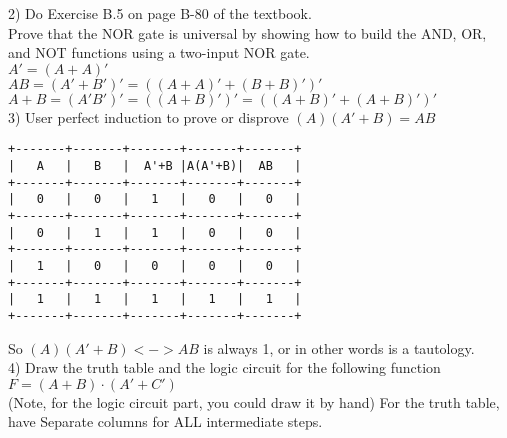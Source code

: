 2) Do Exercise B.5 on page B-80 of the textbook. \\

Prove that the NOR gate is universal by showing how to build
the AND, OR, and NOT functions using a two-input NOR gate. \\

$A' = (A + A)'$ \\

$AB = (A' + B')' = ((A+A)' + (B+B)')'$ \\

$A+B = (A'B')' = ((A+B)')' = ((A+B)' + (A+B)')'$ \\

3) User perfect induction to prove or disprove $(A) (A' + B) = AB$ \\

\begin{verbatim}
+-------+-------+-------+-------+-------+
|   A   |   B   |  A'+B |A(A'+B)|  AB   |
+-------+-------+-------+-------+-------+
|   0   |   0   |   1   |   0   |   0   |
+-------+-------+-------+-------+-------+
|   0   |   1   |   1   |   0   |   0   |
+-------+-------+-------+-------+-------+
|   1   |   0   |   0   |   0   |   0   |
+-------+-------+-------+-------+-------+
|   1   |   1   |   1   |   1   |   1   |
+-------+-------+-------+-------+-------+
\end{verbatim}

So $(A) (A' + B) <-> AB$ is always 1, or in other words is a tautology. \\


4) Draw the truth table and the logic circuit for the following function $F = (A + B) \cdot (A' + C')$ \\

(Note, for the logic circuit part, you could draw it by hand) For the truth table, have Separate columns for ALL intermediate steps. \\

